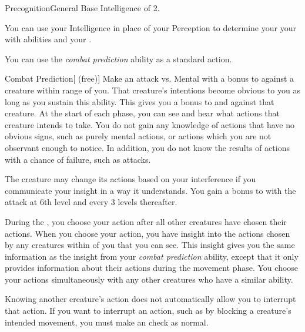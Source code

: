     \begin{feat}{Precognition}{General}
        \featpre Base Intelligence of 2.

         You can use your Intelligence in place of your Perception to determine your your  with  abilities and your .

         You can use the \textit{combat prediction} ability as a standard action.
        \begin{freeability}{Combat Prediction}[ (free)]
            Make an attack vs. Mental with a  bonus to  against a creature within \rngmed range of you.
            \hit That creature's intentions become obvious to you as long as you sustain this ability.
            This gives you a  bonus to  and  against that creature.
            At the start of each phase, you can see and hear what actions that creature intends to take.
            You do not gain any knowledge of actions that have no obvious signs, such as purely mental actions, or actions which you are not observant enough to notice.
            In addition, you do not know the results of actions with a chance of failure, such as attacks.

            The creature may change its actions based on your interference if you communicate your insight in a way it understands.
            \rankline
            You gain a  bonus to  with the attack at 6th level and every 3 levels thereafter.
        \end{freeability}

         During the , you choose your action after all other creatures have chosen their actions.
        When you choose your action, you have insight into the actions chosen by any creatures within \shortrange of you that you can see.
        This insight gives you the same information as the insight from your \textit{combat prediction} ability, except that it only provides information about their actions during the movement phase.
        You choose your actions simultaneously with any other creatures who have a similar ability.

        Knowing another creature's action does not automatically allow you to interrupt that action.
        If you want to interrupt an action, such as by blocking a creature's intended movement, you must make an  check as normal.


\end{feat}
